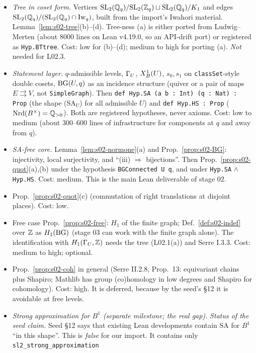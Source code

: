\begin{itemize}
\item[L02.1] \emph{Tree in coset form.} Vertices $\mathrm{SL}_2(\mathbb{Q}_q)/\mathrm{SL}_2(\mathbb{Z}_q)\sqcup\mathrm{SL}_2(\mathbb{Q}_q)/K_1$ and edges
  $\mathrm{SL}_2(\mathbb{Q}_q)/(\mathrm{SL}_2(\mathbb{Q}_q)\cap\mathrm{Iw}_q)$, built from the import's Iwahori material. Lemma~\ref{lem:s02-tree}(b)--(d).
  Tree-ness (a) is either ported from Ludwig--Merten (about 8000 lines on Lean v4.19.0, so an API-drift port) or
  registered as \texttt{Hyp.BTtree}. Cost: low for (b)--(d); medium to high for porting (a). \emph{Not} needed for
  L02.3.
\item[L02.2] \emph{Statement layer.} $q$-admissible levels, $\Gamma_U$, $X^1_B(U)$, $s_0,s_1$ on \texttt{classSet}-style
  double cosets, $\mathrm{BG}(U,q)$ as an incidence structure (quiver or a pair of maps $E\rightrightarrows V$, not
  \texttt{SimpleGraph}). Then \texttt{def Hyp.SA (a b : Int) (q : Nat) : Prop} (the shape (SA$_U$) for all admissible
  $U$) and \texttt{def Hyp.HS : Prop} ($\mathrm{Nrd}(B^\times)=\mathbb{Q}_{>0}$). Both are registered hypotheses, never axioms.
  Cost: low to medium (about 300--600 lines of infrastructure for components at $q$ and away from $q$).
\item[L02.3] \emph{SA-free core.} Lemma~\ref{lem:s02-normone}(a) and Prop.~\ref{prop:s02-BG}: injectivity,
  local surjectivity, and ``(iii) $\Rightarrow$ bijections''. Then Prop.~\ref{prop:s02-quot}(a),(b) under the
  hypothesis \texttt{BGConnected U q}, and under \texttt{Hyp.SA} $\wedge$ \texttt{Hyp.HS}. Cost: medium. This is the main Lean
  deliverable of stage 02.
\item[L02.4] Prop.~\ref{prop:s02-quot}(c) (commutation of right translations at disjoint places). Cost: low.
\item[L02.5] Free case Prop.~\ref{prop:s02-free}: $H_1$ of the finite graph; Def.~\ref{def:s02-indef} over $\mathbb{Z}$ as
  $H_1(\mathrm{BG})$ (stage 03 can work with the finite graph alone). The identification with $H_1(\Gamma_U,\mathbb{Z})$ needs the
  tree (L02.1(a)) and Serre I.3.3. Cost: medium to high; optional.
\item[L02.6] Prop.~\ref{prop:s02-coh} in general (Serre II.2.8, Prop.~13: equivariant chains plus Shapiro; Mathlib
  has group (co)homology in low degrees and Shapiro for cohomology). Cost: high. It is deferred, because by the
  seed's \S12 it is avoidable at free levels.
\item[L02.SA] \emph{Strong approximation for $B^1$ (separate milestone; the real gap).}
  \emph{Status of the seed claim.} Seed \S12 says that existing Lean developments contain SA for $B^1$ ``in
  this shape''. This is \emph{false} for our import. It contains only \texttt{sl2\_strong\_approximation}

\end{itemize}
